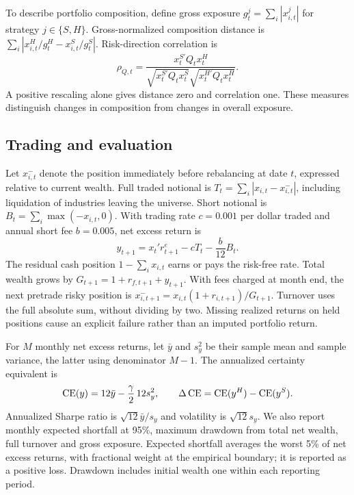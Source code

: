 To describe portfolio composition, define gross exposure $g^j_t=\sum_i|x^j_{i,t}|$ for strategy $j\in\{S,H\}$. Gross-normalized composition distance is $\sum_i|x^H_{i,t}/g^H_t-x^S_{i,t}/g^S_t|$. Risk-direction correlation is
\begin{equation}
\rho_{Q,t}=\frac{x_t^{S\prime}Q_t x_t^H}
{\sqrt{x_t^{S\prime}Q_t x_t^S}\sqrt{x_t^{H\prime}Q_t x_t^H}}.
\label{eq:direction-correlation}
\end{equation}
A positive rescaling alone gives distance zero and correlation one. These measures distinguish changes in composition from changes in overall exposure.

\subsection{Trading and evaluation}
Let $x^-_{i,t}$ denote the position immediately before rebalancing at date $t$, expressed relative to current wealth. Full traded notional is $T_t=\sum_i|x_{i,t}-x^-_{i,t}|$, including liquidation of industries leaving the universe. Short notional is $B_t=\sum_i\max(-x_{i,t},0)$. With trading rate $c=0.001$ per dollar traded and annual short fee $b=0.005$, net excess return is
\begin{equation}
y_{t+1}=x_t'r^e_{t+1}-cT_t-\frac{b}{12}B_t.
\label{eq:net}
\end{equation}
The residual cash position $1-\sum_i x_{i,t}$ earns or pays the risk-free rate. Total wealth grows by $G_{t+1}=1+r_{f,t+1}+y_{t+1}$. With fees charged at month end, the next pretrade risky position is $x^-_{i,t+1}=x_{i,t}(1+r_{i,t+1})/G_{t+1}$. Turnover uses the full absolute sum, without dividing by two. Missing realized returns on held positions cause an explicit failure rather than an imputed portfolio return.

For $M$ monthly net excess returns, let $\bar y$ and $s_y^2$ be their sample mean and sample variance, the latter using denominator $M-1$. The annualized certainty equivalent is
\begin{equation}
\operatorname{CE}(y)=12\bar y-\frac{\gamma}{2}\,12s_y^2,
\qquad \Delta\operatorname{CE}=\operatorname{CE}(y^H)-\operatorname{CE}(y^S).
\label{eq:ce}
\end{equation}
Annualized Sharpe ratio is $\sqrt{12}\bar y/s_y$ and volatility is $\sqrt{12}s_y$. We also report monthly expected shortfall at 95\%, maximum drawdown from total net wealth, full turnover and gross exposure. Expected shortfall averages the worst 5\% of net excess returns, with fractional weight at the empirical boundary; it is reported as a positive loss. Drawdown includes initial wealth one within each reporting period.

